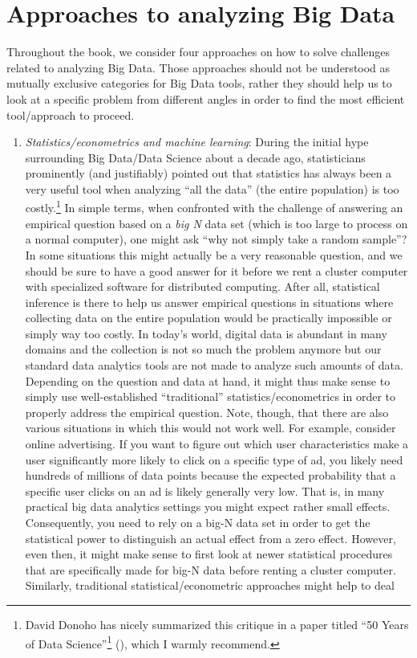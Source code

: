 \documentclass[
  12pt,
]{style/krantz}
\renewcommand{\href}[2]{#2\footnote{\url{#1}}}
\begin{document}
\hypertarget{approaches-to-analyzing-big-data}{%
\section{Approaches to analyzing Big Data}\label{approaches-to-analyzing-big-data}}

Throughout the book, we consider four approaches on how to solve challenges related to analyzing Big Data. Those approaches should not be understood as mutually exclusive categories for Big Data tools, rather they should help us to look at a specific problem from different angles in order to find the most efficient tool/approach to proceed.

\begin{enumerate}
\def\labelenumi{\arabic{enumi}.}
\item
  \emph{Statistics/econometrics and machine learning}: During the initial hype surrounding Big Data/Data Science about a decade ago, statisticians prominently (and justifiably) pointed out that statistics has always been a very useful tool when analyzing ``all the data'' (the entire population) is too costly.\footnote{David Donoho has nicely summarized this critique in a paper titled \href{https://doi.org/10.1080/10618600.2017.1384734}{``50 Years of Data Science''} (\citet{donoho_2017}), which I warmly recommend.} In simple terms, when confronted with the challenge of answering an empirical question based on a \emph{big N} data set (which is too large to process on a normal computer), one might ask ``why not simply take a random sample''? In some situations this might actually be a very reasonable question, and we should be sure to have a good answer for it before we rent a cluster computer with specialized software for distributed computing. After all, statistical inference is there to help us answer empirical questions in situations where collecting data on the entire population would be practically impossible or simply way too costly. In today's world, digital data is abundant in many domains and the collection is not so much the problem anymore but our standard data analytics tools are not made to analyze such amounts of data. Depending on the question and data at hand, it might thus make sense to simply use well-established ``traditional'' statistics/econometrics in order to properly address the empirical question. Note, though, that there are also various situations in which this would not work well. For example, consider online advertising. If you want to figure out which user characteristics make a user significantly more likely to click on a specific type of ad, you likely need hundreds of millions of data points because the expected probability that a specific user clicks on an ad is likely generally very low. That is, in many practical big data analytics settings you might expect rather small effects. Consequently, you need to rely on a big-N data set in order to get the statistical power to distinguish an actual effect from a zero effect. However, even then, it might make sense to first look at newer statistical procedures that are specifically made for big-N data before renting a cluster computer. Similarly, traditional statistical/econometric approaches might help to deal 
\end{enumerate}
\end{document}
